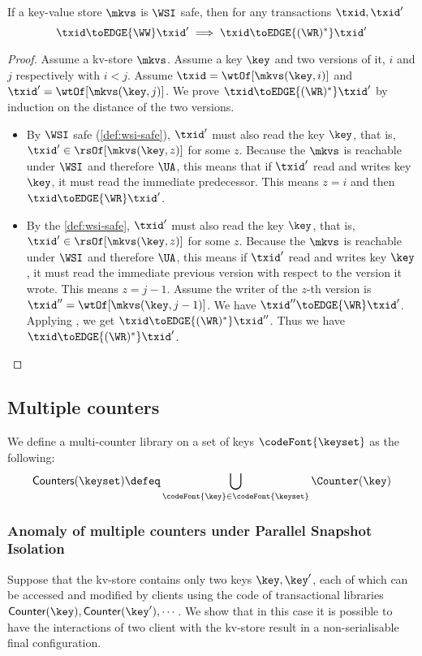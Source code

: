 \begin{lemma}
    \label{lem:wsi-ww-to-wr}
    If a key-value store \( \mkvs \) is \(\WSI\) safe, then for any transactions \( \txid, \txid' \)
    \[
        \txid \toEDGE{\WW} \txid' \implies \txid \toEDGE{(\WR)^*} \txid' 
    \]
\end{lemma}
\begin{proof}
    Assume a kv-store \( \mkvs \).
    Assume a key \( \key \) and two versions of it, \( i \) and \( j \) respectively with \( i< j\).
    Assume \(\txid = \wtOf[\mkvs(\key, i)] \) and \( \txid' = \wtOf[\mkvs(\key, j)] \).
    We prove \( \txid \toEDGE{(\WR)^*} \txid' \) by induction on the distance of the two versions.
    \begin{itemize}
    \item {}
    By \( \WSI \) safe (\cref{def:wsi-safe}), \( \txid' \) must also read the key \( \key \),
    that is, \( \txid' \in \rsOf[\mkvs(\key,z)]\) for some \( z \).
    Because the \( \mkvs \) is reachable under \( \WSI \) and therefore \( \UA \),
    this means that if \( \txid' \) read and writes key \( \key \), 
    it must read the immediate predecessor.
    This means \( z = i\) and then \( \txid \toEDGE{\WR} \txid' \).
    \item {}
    By the \cref{def:wsi-safe}, \( \txid' \) must also read the key \( \key \),
    that is, \( \txid' \in \rsOf[\mkvs(\key,z)]\) for some \( z \).
    Because the \( \mkvs \) is reachable under \( \WSI \) and therefore \( \UA \),
    this means if \( \txid' \) read and writes key \( \key \), 
    it must read the immediate previous version with respect to the version it wrote.
    This means \( z = j - 1\).
    Assume the writer of the \(z\)-th version is \( \txid'' = \wtOf[\mkvs(\key, j-1)]\).
    We have \( \txid'' \toEDGE{\WR} \txid' \).
    Applying \ih,  we get \( \txid \toEDGE{(\WR)^*} \txid'' \).
    Thus we have \( \txid \toEDGE{(\WR)^*} \txid' \).
    \end{itemize}
\end{proof}

\subsection{Multiple counters}
\label{sec:multi-counter-robust}
We define a multi-counter library on a set of keys \( \codeFont{\keyset} \) as the following:
\[
    \mathsf{Counters(\keyset)} \defeq \bigcup_{\codeFont{\key} \in \codeFont{\keyset} } \Counter(\key)
\]
\subsubsection{Anomaly of multiple counters under Parallel Snapshot Isolation}
Suppose that the kv-store contains only two keys $\key, \key'$, each of which 
can be accessed and modified by clients using the code of transactional libraries 
$\mathsf{Counter}(\key), \mathsf{Counter}(\key'), \cdots$. We show that in this
 case it is possible to have the interactions of two client with the kv-store result 
 in  a non-serialisable final configuration. 
 
